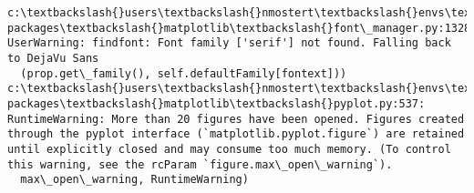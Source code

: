 \documentclass[11pt]{article}
\begin{document}
    \begin{Verbatim}[commandchars=\\\{\}]
c:\textbackslash{}users\textbackslash{}nmostert\textbackslash{}envs\textbackslash{}spew\textbackslash{}lib\textbackslash{}site-packages\textbackslash{}matplotlib\textbackslash{}font\_manager.py:1328: UserWarning: findfont: Font family ['serif'] not found. Falling back to DejaVu Sans
  (prop.get\_family(), self.defaultFamily[fontext]))
c:\textbackslash{}users\textbackslash{}nmostert\textbackslash{}envs\textbackslash{}spew\textbackslash{}lib\textbackslash{}site-packages\textbackslash{}matplotlib\textbackslash{}pyplot.py:537: RuntimeWarning: More than 20 figures have been opened. Figures created through the pyplot interface (`matplotlib.pyplot.figure`) are retained until explicitly closed and may consume too much memory. (To control this warning, see the rcParam `figure.max\_open\_warning`).
  max\_open\_warning, RuntimeWarning)

    \end{Verbatim}

    \begin{center}
    \end{center}
    { \hspace*{\fill} \\}
    
    \begin{center}
    \end{center}
    { \hspace*{\fill} \\}
    
    \begin{center}
    \end{center}
    { \hspace*{\fill} \\}
    
    \begin{center}
    \end{center}
    { \hspace*{\fill} \\}
    
    \begin{center}
    \end{center}
    { \hspace*{\fill} \\}
    
\end{document}
